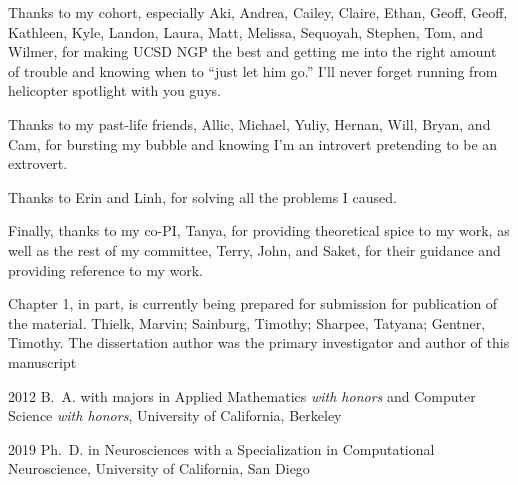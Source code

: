 \begin{frontmatter}
\begin{acknowledgements}
 Thanks to my cohort, especially Aki, Andrea, Cailey, Claire, Ethan, Geoff, Geoff, Kathleen, Kyle, Landon, Laura, Matt, Melissa, Sequoyah, Stephen, Tom, and Wilmer, for making UCSD NGP the best and getting me into the right amount of trouble and knowing when to ``just let him go.'' I'll never forget running from helicopter spotlight with you guys.
 
 Thanks to my past-life friends, Allic, Michael, Yuliy, Hernan, Will, Bryan, and Cam, for bursting my bubble and knowing I'm an introvert pretending to be an extrovert.
 
 Thanks to Erin and Linh, for solving all the problems I caused.
 
 Finally, thanks to my co-PI, Tanya, for providing theoretical spice to my work, as well as the rest of my committee, Terry, John, and Saket, for their guidance and providing reference to my work.
 
 \clearpage
 
 Chapter 1, in part, is currently being prepared for submission for publication of the material. Thielk, Marvin; Sainburg, Timothy; Sharpee, Tatyana; Gentner, Timothy. The dissertation author was the primary investigator and author of this manuscript
\end{acknowledgements}


%
%
\begin{vitapage}
\begin{vita}
  \item[2012] B.~A. with majors in Applied Mathematics \emph{with honors} and Computer Science \emph{with honors}, University of California, Berkeley
  \item[2019] Ph.~D. in Neurosciences with a Specialization in Computational Neuroscience, University of California, San Diego
\end{vita}
\end{vitapage}



\end{frontmatter}

